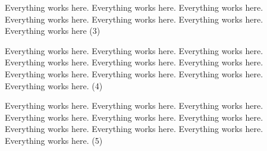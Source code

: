 \documentclass[11pt,twoside]{book}
\begin{document}
\begin{pages}
\begin{Rightside}
Everything works here. Everything works here. Everything works here. Everything works here. Everything works here. Everything works here. Everything works here (3)

Everything works here. Everything works here. Everything works here. Everything works here. Everything works here. Everything works here. Everything works here. Everything works here. Everything works here. Everything works here. (4)\



Everything works here. Everything works here. Everything works here. Everything works here. Everything works here. Everything works here. Everything works here. Everything works here. Everything works here. Everything works here. (5)\



    \endnumbering
        \end{Rightside}

\end{pages}
\Pages
\end{document}
